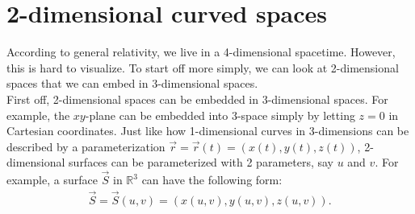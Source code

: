 \documentclass{book}
\theoremstyle{definition}
\begin{document}
\section{2-dimensional curved spaces}
According to general relativity, we live in a 4-dimensional spacetime. However, this is hard to visualize. To start off more simply, we can look at 2-dimensional spaces that we can embed in 3-dimensional spaces.\\

First off, 2-dimensional spaces can be embedded in 3-dimensional spaces. For example, the $xy$-plane can be embedded into 3-space simply by letting $z=0$ in Cartesian coordinates. Just like how 1-dimensional curves in 3-dimensions can be described by a parameterization $\vec{r} = \vec{r}(t) = (x(t),y(t),z(t))$, 2-dimensional surfaces can be parameterized with 2 parameters, say $u$ and $v$. For example, a surface $\vec{S}$ in $\mathbb{R}^3$ can have the following form:
\begin{align*}
\vec{S} = \vec{S}(u,v) = (x(u,v), y(u,v), z(u,v)).
\end{align*}
\end{document}
